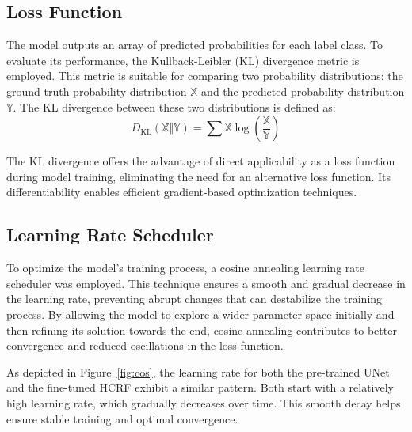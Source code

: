 \documentclass[conference]{IEEEtran}
\newcommand{\XX}{{\mathbb{X}}}
\newcommand{\YY}{{\mathbb{Y}}}
\begin{document}
\subsection{Loss Function}


The model outputs an array of predicted probabilities for each label class.
To evaluate its performance, the Kullback-Leibler (KL) divergence metric is
employed. This metric is suitable for comparing two probability distributions: 
the ground truth probability distribution $\XX$ and the predicted probability
distribution $\YY$. The KL divergence between these two distributions is
defined as:
\begin{equation*}
D_\mathrm{KL}(\XX \Vert \YY) = \sum \XX \log\left(\frac{\XX}{\YY}\right)
\end{equation*}


The KL divergence offers the advantage of direct applicability as a loss
function during model training, eliminating the need for an alternative loss
function. Its differentiability enables efficient gradient-based optimization
techniques.


\subsection{Learning Rate Scheduler}


To optimize the model's training process, a cosine annealing learning rate
scheduler was employed. This technique ensures a smooth and gradual decrease in
the learning rate, preventing abrupt changes that can destabilize the training
process. By allowing the model to explore a wider parameter space initially and
then refining its solution towards the end, cosine annealing contributes to
better convergence and reduced oscillations in the loss function.


As depicted in Figure~\ref{fig:cos}, the learning rate for both the pre-trained
UNet and the fine-tuned HCRF exhibit a similar pattern. Both start with a
relatively high learning rate, which gradually decreases over time.
This smooth decay helps ensure stable training and optimal convergence.
\end{document}
